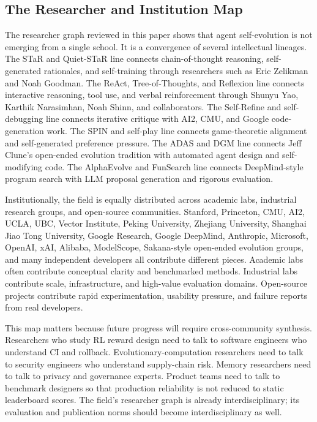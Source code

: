 \subsection{The Researcher and Institution Map}

The researcher graph reviewed in this paper shows that agent self-evolution is not emerging from a single school. It is a convergence of several intellectual lineages. The STaR and Quiet-STaR line connects chain-of-thought reasoning, self-generated rationales, and self-training through researchers such as Eric Zelikman and Noah Goodman. The ReAct, Tree-of-Thoughts, and Reflexion line connects interactive reasoning, tool use, and verbal reinforcement through Shunyu Yao, Karthik Narasimhan, Noah Shinn, and collaborators. The Self-Refine and self-debugging line connects iterative critique with AI2, CMU, and Google code-generation work. The SPIN and self-play line connects game-theoretic alignment and self-generated preference pressure. The ADAS and DGM line connects Jeff Clune's open-ended evolution tradition with automated agent design and self-modifying code. The AlphaEvolve and FunSearch line connects DeepMind-style program search with LLM proposal generation and rigorous evaluation.

Institutionally, the field is equally distributed across academic labs, industrial research groups, and open-source communities. Stanford, Princeton, CMU, AI2, UCLA, UBC, Vector Institute, Peking University, Zhejiang University, Shanghai Jiao Tong University, Google Research, Google DeepMind, Anthropic, Microsoft, OpenAI, xAI, Alibaba, ModelScope, Sakana-style open-ended evolution groups, and many independent developers all contribute different pieces. Academic labs often contribute conceptual clarity and benchmarked methods. Industrial labs contribute scale, infrastructure, and high-value evaluation domains. Open-source projects contribute rapid experimentation, usability pressure, and failure reports from real developers.

This map matters because future progress will require cross-community synthesis. Researchers who study RL reward design need to talk to software engineers who understand CI and rollback. Evolutionary-computation researchers need to talk to security engineers who understand supply-chain risk. Memory researchers need to talk to privacy and governance experts. Product teams need to talk to benchmark designers so that production reliability is not reduced to static leaderboard scores. The field's researcher graph is already interdisciplinary; its evaluation and publication norms should become interdisciplinary as well.

